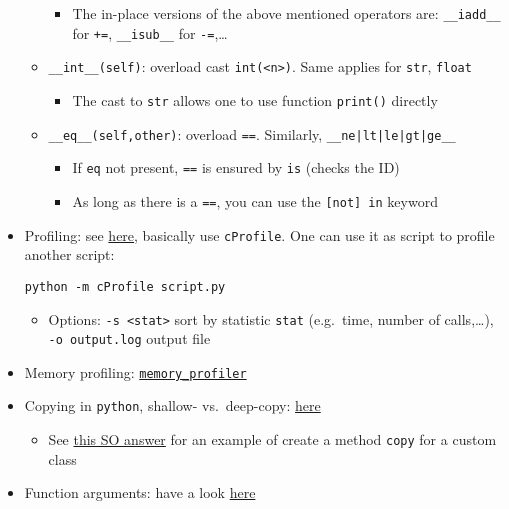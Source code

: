 \documentclass[a4paper,12pt,%
              final%
              ]{article}
\begin{document}
\begin{itemize}
\begin{itemize}
\begin{itemize}
          \item The in-place versions of the above mentioned operators are: \verb|__iadd__| for \verb|+=|, \verb|__isub__| for \verb|-=|,\ldots
        \end{itemize}
      \item \verb|__int__(self)|: overload cast \verb|int(<n>)|. Same applies for \verb|str|, \verb|float|
        \begin{itemize}
          \item The cast to \verb|str| allows one to use function \verb|print()| directly
        \end{itemize}
      \item \verb|__eq__(self,other)|: overload \verb|==|. Similarly, \verb!__ne|lt|le|gt|ge__!
        \begin{itemize}
          \item If \texttt{eq} not present, \texttt{==} is ensured by \texttt{is} (checks the ID)
          \item As long as there is a \texttt{==}, you can use the \verb|[not] in| keyword
        \end{itemize}
    \end{itemize}
  \item Profiling: see \href{https://docs.python.org/3/library/profile.html}{here}, basically use \texttt{cProfile}. One can use it as script to profile another script:
\begin{verbatim}
python -m cProfile script.py
\end{verbatim}
    \begin{itemize}
      \item Options: \verb|-s <stat>| sort by statistic \texttt{stat} (e.g.~time, number of calls,\ldots), \verb|-o output.log| output file
    \end{itemize}
  \item Memory profiling: \href{https://github.com/pythonprofilers/memory_profiler}{\texttt{memory\_profiler}}
  \item Copying in \texttt{python}, shallow- vs.~deep-copy: \href{https://www.programiz.com/python-programming/shallow-deep-copy}{here}
    \begin{itemize}
      \item See \href{https://stackoverflow.com/a/46939443}{this SO answer} for an example of create a method \texttt{copy} for a custom class
    \end{itemize}
  \item Function arguments: have a look \href{https://www.python-course.eu/python3_passing_arguments.php}{here}

\end{itemize}
\end{document}
